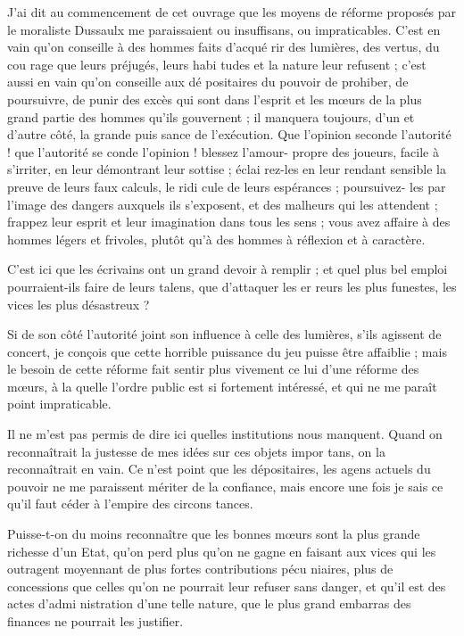 J'ai dit au commencement de cet
ouvrage que les moyens de réforme
proposés par le moraliste Dussaulx
me paraissaient ou insuffisans, ou
impraticables. C'est en vain qu'on
conseille à des hommes faits d'acqué%
rir des lumières, des vertus, du cou%
rage que leurs préjugés, leurs habi
tudes et la nature leur refusent ; c'est
aussi en vain qu'on conseille aux dé%
positaires du pouvoir de prohiber, de
poursuivre, de punir des excès qui
sont dans l'esprit et les mœurs de la
plus grand partie des hommes qu'ils
gouvernent ; il manquera toujours,
d'un et d'autre côté, la grande puis%
sance de l'exécution. Que l'opinion
seconde l'autorité ! que l'autorité se%
conde l'opinion ! blessez l'amour-%
propre des joueurs, facile à s'irriter,
en leur démontrant leur sottise ; éclai%
rez-les en leur rendant sensible la
preuve de leurs faux calculs, le ridi%
cule de leurs espérances ; poursuivez-%
les par l'image des dangers auxquels
ils s'exposent, et des malheurs qui les 
attendent ; frappez leur esprit et leur
imagination dans tous les sens ; vous
avez affaire à des hommes légers et
frivoles, plutôt qu'à des hommes à
réflexion et à caractère.

C'est ici que les écrivains ont un
grand devoir à remplir ; et quel plus
bel emploi pourraient-ils faire de
leurs talens, que d'attaquer les er%
reurs les plus funestes, les vices les
plus désastreux ?

Si de son côté l'autorité joint son
influence à celle des lumières, s'ils
agissent de concert, je conçois que
cette horrible puissance du jeu puisse
être affaiblie ; mais le besoin de cette
réforme fait sentir plus vivement ce%
lui d'une réforme des mœurs, à la%
quelle l'ordre public est si fortement
intéressé, et qui ne me paraît point
impraticable.

Il ne m'est pas permis de dire ici
quelles institutions nous manquent.
Quand on reconnaîtrait la justesse 
de mes idées sur ces objets impor%
tans, on la reconnaîtrait en vain.
Ce n'est point que les dépositaires,
les agens actuels du pouvoir ne me
paraissent mériter de la confiance,
mais encore une fois je sais ce qu'il
faut céder à l'empire des circons%
tances.

Puisse-t-on du moins reconnaître
que les bonnes mœurs sont la plus
grande richesse d'un Etat, qu'on perd
plus qu'on ne gagne en faisant aux
vices qui les outragent moyennant
de plus fortes contributions pécu%
niaires, plus de concessions que celles
qu'on ne pourrait leur refuser sans
danger, et qu'il est des actes d'admi%
nistration d'une telle nature, que le
plus grand embarras des finances ne
pourrait les justifier.

